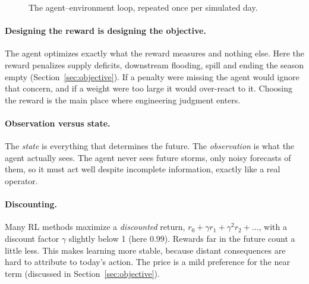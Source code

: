\begin{figure}[h]
\centering
{}
\caption{The agent--environment loop, repeated once per simulated day.}
\label{fig:loop}
\end{figure}

\paragraph{Designing the reward is designing the objective.} The agent
optimizes exactly what the reward measures and nothing else. Here the
reward penalizes supply deficits, downstream flooding, spill and ending
the season empty (Section~\ref{sec:objective}). If a penalty were missing
the agent would ignore that concern, and if a weight were too large it
would over-react to it. Choosing the reward is the main place where
engineering judgment enters.

\paragraph{Observation versus state.} The \emph{state} is everything that
determines the future. The \emph{observation} is what the agent actually
sees. The agent never sees future storms, only noisy forecasts of them, so
it must act well despite incomplete information, exactly like a real
operator.

\paragraph{Discounting.} Many RL methods maximize a \emph{discounted}
return, $r_0+\gamma r_1+\gamma^2 r_2+\dots$, with a discount factor $\gamma$
slightly below 1 (here $0.99$). Rewards far in the future count a little
less. This makes learning more stable, because distant consequences are
hard to attribute to today's action. The price is a mild preference for
the near term (discussed in Section~\ref{sec:objective}).

